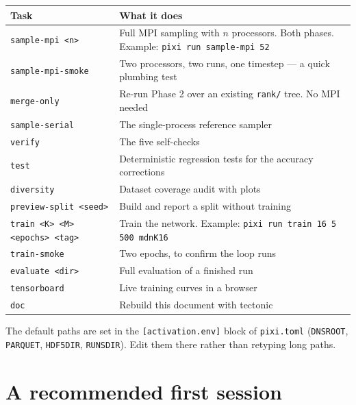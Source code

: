 \documentclass[11pt,a4paper]{report}
\newcommand{\code}[1]{\texttt{#1}}
\renewcommand{\_}{\origtextunderscore\allowbreak}
\begin{document}
\begin{longtable}{@{}lp{10.2cm}@{}}
\toprule
\textbf{Task} & \textbf{What it does} \\
\midrule
\endhead
\code{sample-mpi <n>}   & Full MPI sampling with $n$ processors. Both phases.
                          Example: \code{pixi run sample-mpi 52} \\
\code{sample-mpi-smoke} & Two processors, two runs, one timestep --- a quick plumbing test \\
\code{merge-only}       & Re-run Phase 2 over an existing \code{\_rank/} tree. No MPI needed \\
\code{sample-serial}    & The single-process reference sampler \\
\code{verify}           & The five self-checks \\
\code{test}             & Deterministic regression tests for the accuracy corrections \\
\code{diversity}        & Dataset coverage audit with plots \\
\code{preview-split <seed>} & Build and report a split without training \\
\code{train <K> <M> <epochs> <tag>} & Train the network.
                          Example: \code{pixi run train 16 5 500 mdn\_K16} \\
\code{train-smoke}      & Two epochs, to confirm the loop runs \\
\code{evaluate <dir>}   & Full evaluation of a finished run \\
\code{tensorboard}      & Live training curves in a browser \\
\code{doc}              & Rebuild this document with tectonic \\
\bottomrule
\end{longtable}

The default paths are set in the \code{[activation.env]} block of \code{pixi.toml}
(\code{DNS\_ROOT}, \code{PARQUET}, \code{HDF5\_DIR}, \code{RUNS\_DIR}). Edit them there rather
than retyping long paths.

\section{A recommended first session}
\end{document}
